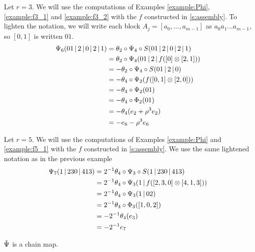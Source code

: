 \begin{example}\label{example:psi3}
Let $r=3$. We will use the computations of Examples \ref{example:Phi}, \ref{example:f3_1} and \ref{example:f3_2} with the $f$ constructed in \cref{s:assembly}. To lighten the notation, we will write each block $A_j = [a_0,\dots,a_{m-1}]$ as $a_0a_1\dots a_{m-1}$, so $[0,1]$ is written $01$.
	\begin{align*}
		\Psi_6(01\operatorname{|} 2\operatorname{|} 0\operatorname{|} 2\operatorname{|} 1)
		&= \theta_2\circ \Psi_4\circ S(01\operatorname{|} 2\operatorname{|} 0\operatorname{|} 2\operatorname{|} 1)
		\\
		&= \theta_2\circ \Psi_4(01\operatorname{|} 2\operatorname{|} f([0] \otimes [2,1]))
		\\
		&= -\theta_2\circ \Psi_4\circ S(01\operatorname{|} 2\operatorname{|} 0)
		\\
		&= -\theta_4\circ \Psi_2(f([0,1] \otimes [2,0]))
		\\
		&= -\theta_4\circ \Psi_2(01)
		\\
		&= -\theta_4\circ \Phi_2(01)
		\\
		&= -\theta_4(e_2 + \rho^3e_2)
		\\
		&= -e_6 - \rho^3e_6
	\end{align*}
\end{example}

\begin{example}\label{example:psi5}
Let $r=5$. We will use the computations of Examples \ref{example:Phi} and \ref{example:f5_1} with the $f$ constructed in \cref{s:assembly}. We use the same lightened notation as in the previous example
	\begin{align*}
		\Psi_7(1\operatorname{|} 230\operatorname{|} 413)
		&= 2^{-1}\theta_4\circ \Psi_3\circ S(1\operatorname{|} 230\operatorname{|} 413)
		\\
		&= 2^{-1}\theta_4\circ \Psi_3(1\operatorname{|} f([2,3,0] \otimes [4,1,3]))
		\\
		&= 2^{-1}\theta_4\circ \Psi_3(1\operatorname{|} 02)
		\\
		&= 2^{-1}\theta_4\circ \Phi_3([1,0,2])
		\\
		&= -2^{-1}\theta_4(e_3)
		\\
		&= -2^{-1}e_7
	\end{align*}
\end{example}

\begin{proposition}\label{prop:chain}
	$\operatorname{\check{\Psi}}$ is a chain map. %
\end{proposition}

